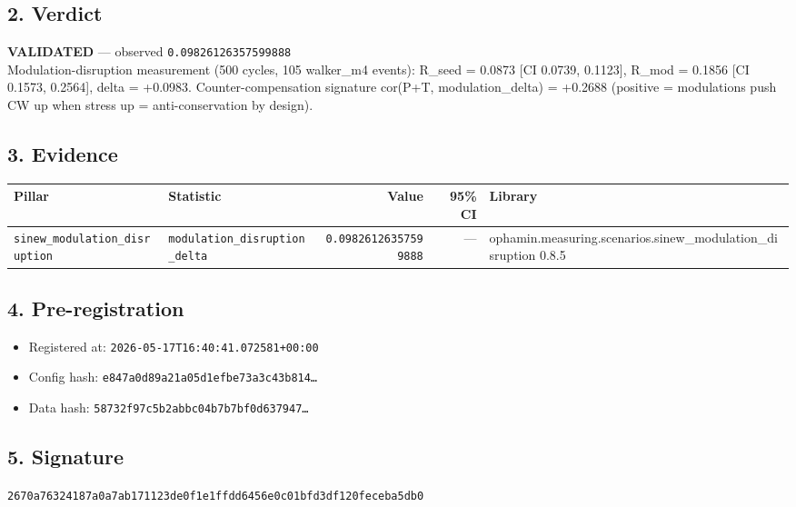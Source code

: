 \documentclass{article}
\begin{document}
\subsection*{2. Verdict}
\textcolor{validated}{\textbf{VALIDATED}} --- observed \texttt{0.09826126357599888}\\
Modulation-disruption measurement (500 cycles, 105 walker\_m4 events): R\_seed = 0.0873 [CI 0.0739, 0.1123], R\_mod = 0.1856 [CI 0.1573, 0.2564], delta = +0.0983. Counter-compensation signature cor(P+T, modulation\_delta) = +0.2688 (positive = modulations push CW up when stress up = anti-conservation by design).
\subsection*{3. Evidence}
\begin{tabular}{llrrl}\toprule
\textbf{Pillar} & \textbf{Statistic} & \textbf{Value} & \textbf{95\% CI} & \textbf{Library} \\\midrule
\texttt{sinew\_modulation\_disruption} & \texttt{modulation\_disruption\_delta} & \texttt{0.09826126357599888} & --- & ophamin.measuring.scenarios.sinew\_modulation\_disruption 0.8.5 \\
\bottomrule\end{tabular}
\subsection*{4. Pre-registration}
\begin{itemize}
\item Registered at: \texttt{2026-05-17T16:40:41.072581+00:00}
\item Config hash: \texttt{e847a0d89a21a05d1efbe73a3c43b814\dots}
\item Data hash: \texttt{58732f97c5b2abbc04b7b7bf0d637947\dots}
\end{itemize}
\subsection*{5. Signature}
\texttt{2670a76324187a0a7ab171123de0f1e1ffdd6456e0c01bfd3df120feceba5db0}\\
\end{document}
